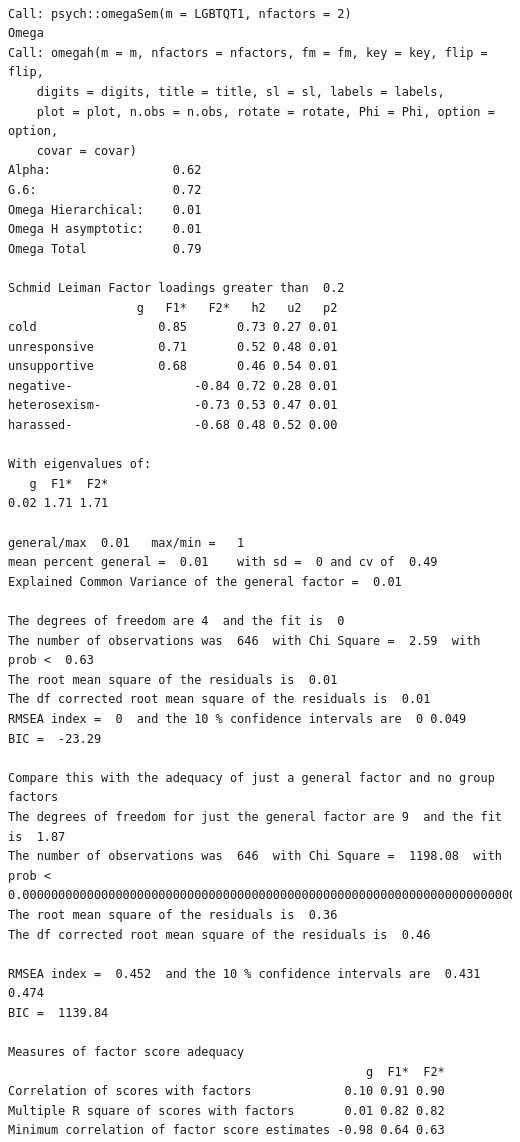 \documentclass[
  english,
]{book}
\begin{document}
\begin{verbatim}
 
Call: psych::omegaSem(m = LGBTQT1, nfactors = 2)
Omega 
Call: omegah(m = m, nfactors = nfactors, fm = fm, key = key, flip = flip, 
    digits = digits, title = title, sl = sl, labels = labels, 
    plot = plot, n.obs = n.obs, rotate = rotate, Phi = Phi, option = option, 
    covar = covar)
Alpha:                 0.62 
G.6:                   0.72 
Omega Hierarchical:    0.01 
Omega H asymptotic:    0.01 
Omega Total            0.79 

Schmid Leiman Factor loadings greater than  0.2 
                  g   F1*   F2*   h2   u2   p2
cold                 0.85       0.73 0.27 0.01
unresponsive         0.71       0.52 0.48 0.01
unsupportive         0.68       0.46 0.54 0.01
negative-                 -0.84 0.72 0.28 0.01
heterosexism-             -0.73 0.53 0.47 0.01
harassed-                 -0.68 0.48 0.52 0.00

With eigenvalues of:
   g  F1*  F2* 
0.02 1.71 1.71 

general/max  0.01   max/min =   1
mean percent general =  0.01    with sd =  0 and cv of  0.49 
Explained Common Variance of the general factor =  0.01 

The degrees of freedom are 4  and the fit is  0 
The number of observations was  646  with Chi Square =  2.59  with prob <  0.63
The root mean square of the residuals is  0.01 
The df corrected root mean square of the residuals is  0.01
RMSEA index =  0  and the 10 % confidence intervals are  0 0.049
BIC =  -23.29

Compare this with the adequacy of just a general factor and no group factors
The degrees of freedom for just the general factor are 9  and the fit is  1.87 
The number of observations was  646  with Chi Square =  1198.08  with prob <  0.0000000000000000000000000000000000000000000000000000000000000000000000000000000000000000000000000000000000000000000000000000000000000000000000000000000000000000000000000000000000000000000000000000000000000000000000000000000000000000000000000000000000032
The root mean square of the residuals is  0.36 
The df corrected root mean square of the residuals is  0.46 

RMSEA index =  0.452  and the 10 % confidence intervals are  0.431 0.474
BIC =  1139.84 

Measures of factor score adequacy             
                                                  g  F1*  F2*
Correlation of scores with factors             0.10 0.91 0.90
Multiple R square of scores with factors       0.01 0.82 0.82
Minimum correlation of factor score estimates -0.98 0.64 0.63


\end{verbatim}
\end{document}
